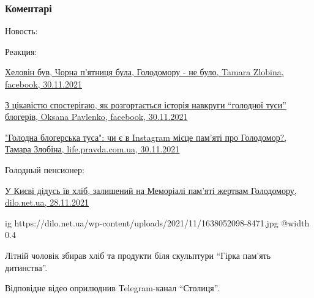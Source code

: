  
 
 
 
 
\subsubsection{Коментарі}

\begin{itemize} %

Новость:


Реакция:

\href{https://www.facebook.com/tamara.zumka/posts/10227302865898844}{%
Хеловін був, Чорна п’ятниця була, Голодомору - не було, Tamara Zlobina, facebook, 30.11.2021%
}

\href{https://www.facebook.com/opavlenko/posts/10226952966598088}{%
З цікавістю спостерігаю, як розгортається історія навкруги \enquote{голодної туси} блогерів, %
Oksana Pavlenko, facebook, 30.11.2021%
}

\href{https://life.pravda.com.ua/columns/2021/11/30/246660/}{%
"Голодна блогерська туса": чи є в Instagram місце пам’яті про Голодомор?, Тамара Злобіна, life.pravda.com.ua, %
30.11.2021%
}

Голодный пенсионер:

\href{https://dilo.net.ua/novyny/u-kyyevi-didus-yiv-hlib-zalyshenyj-na-memoriali-pam-yati-zhertvam-golodomoru/}{%
У Києві дідусь їв хліб, залишений на Меморіалі пам’яті жертвам Голодомору, dilo.net.ua, 28.11.2021%
}


\begin{multicols}{2}

\ifcmt
  ig https://dilo.net.ua/wp-content/uploads/2021/11/1638052098-8471.jpg
  @width 0.4
\fi

Літній чоловік збирав хліб та продукти біля скульптури \enquote{Гірка пам’ять дитинства}.

Відповідне відео оприлюднив Telegram-канал \enquote{Столиця}.


\end{multicols}
\end{itemize}
